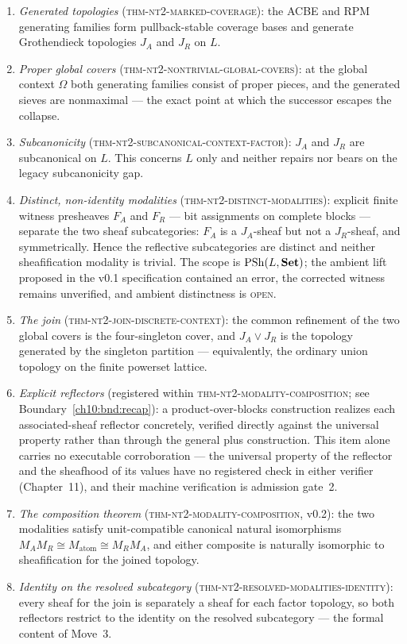 \begin{enumerate}
\item \emph{Generated topologies} (\textsc{thm-nt2-marked-coverage}): the
ACBE and RPM generating families form pullback-stable coverage bases and
generate Grothendieck topologies $J_A$ and $J_R$ on $L$.
\item \emph{Proper global covers}
(\textsc{thm-nt2-nontrivial-global-covers}): at the global context $\Omega$
both generating families consist of proper pieces, and the generated sieves
are nonmaximal --- the exact point at which the successor escapes the
collapse.
\item \emph{Subcanonicity} (\textsc{thm-nt2-subcanonical-context-factor}):
$J_A$ and $J_R$ are subcanonical on $L$. This concerns $L$ only and neither
repairs nor bears on the legacy subcanonicity gap.
\item \emph{Distinct, non-identity modalities}
(\textsc{thm-nt2-distinct-modalities}): explicit finite witness presheaves
$F_A$ and $F_R$ --- bit assignments on complete blocks --- separate the two
sheaf subcategories: $F_A$ is a $J_A$-sheaf but not a $J_R$-sheaf, and
symmetrically. Hence the reflective subcategories are distinct and neither
sheafification modality is trivial. The scope is $\mathrm{PSh}(L, \mathbf{Set})$; the
ambient lift proposed in the v0.1 specification contained an error, the
corrected witness remains unverified, and ambient distinctness is
\textsc{open}.
\item \emph{The join} (\textsc{thm-nt2-join-discrete-context}): the common
refinement of the two global covers is the four-singleton cover, and
$J_A \vee J_R$ is the topology generated by the singleton partition ---
equivalently, the ordinary union topology on the finite powerset lattice.
\item \emph{Explicit reflectors} (registered within
\textsc{thm-nt2-modality-composition}; see
Boundary~\ref{ch10:bnd:recap}): a product-over-blocks construction
realizes each associated-sheaf reflector concretely, verified directly
against the universal property rather than through the general plus
construction. This item alone carries no executable corroboration --- the
universal property of the reflector and the sheafhood of its values have no
registered check in either verifier (Chapter~11), and their machine
verification is admission gate~2.
\item \emph{The composition theorem}
(\textsc{thm-nt2-modality-composition}, v0.2): the two modalities satisfy
unit-compatible canonical natural isomorphisms
$M_A M_R \cong M_{\mathrm{atom}} \cong M_R M_A$, and either composite is
naturally isomorphic to sheafification for the joined topology.
\item \emph{Identity on the resolved subcategory}
(\textsc{thm-nt2-resolved-modalities-identity}): every sheaf for the join
is separately a sheaf for each factor topology, so both reflectors restrict
to the identity on the resolved subcategory --- the formal content of
Move~3.
\end{enumerate}

